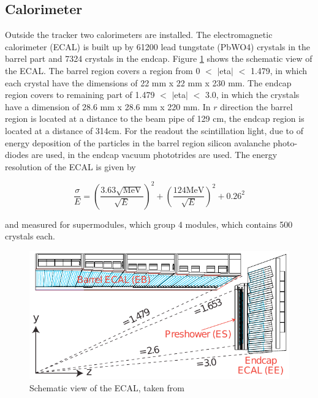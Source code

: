 \subsection*{Calorimeter}

Outside the tracker two calorimeters are installed. The electromagnetic calorimeter (\gls{ECAL}) \cite{CMS2, ECAL} is built up by 61200 lead tungstate (\gls{PbWO4}) crystals in the barrel part and 7324 crystals in the endcap. Figure \ref{fig:fig_2_8} shows the schematic view of the \gls{ECAL}. The barrel region covers a region from 0 $<$ $|$\gls{eta}$|$ $<$ 1.479, in which each crystal have the dimensions of 22 mm x 22 mm x 230 mm. The endcap region covers to remaining part of 1.479 $<$ $|$\gls{eta}$|$ $<$ 3.0, in which the crystals have a dimension of 28.6 mm x 28.6 mm x 220 mm. In $r$ direction the barrel region is located at a distance to the beam pipe of 129 cm, the endcap region is located at a distance of 314cm. For the readout the scintillation light, due to of energy deposition of the particles in the barrel region silicon avalanche photo-diodes are used, in the endcap vacuum phototrides are used. The energy resolution of the \gls{ECAL} is given by

\begin{equation}
	\label{eq:eq_2_4}
	\frac{\sigma}{E} = (\frac{3.63 \sqrt{\text{MeV}}}{\sqrt{E}})^2 + (\frac{124 \text{MeV}}{\sqrt{E}})^2 + 0.26^{2}
\end{equation}

and measured for supermodules, which group 4 modules, which contains 500 crystals each. \\

\begin{figure}[ht]
	\centering
	\includegraphics[width=1\textwidth]{pictures/CMS_ElectromagneticCalorimeter.pdf}

	\caption[Electromagnetic calorimeter of CMS]{Schematic view of the \gls{ECAL}, taken from \cite{CMS2}}
	\label{fig:fig_2_8}
\end{figure}

